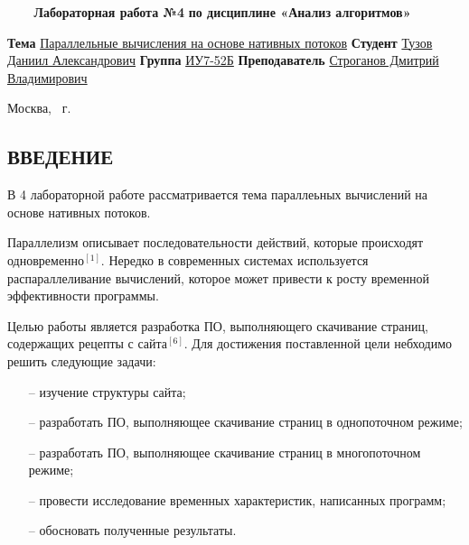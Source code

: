 \documentclass{article}
\begin{document}
\begin{titlepage}
	\noindent\begin{minipage}{1.0\textwidth}\centering
		\Large\textbf{   ~~~ Лабораторная работа №4}\newline
		\textbf{по дисциплине «Анализ алгоритмов»}\newline\newline\newline\newline\newline
	\end{minipage}

	\noindent\textbf{Тема} \underline{Параллельные вычисления на основе нативных потоков}\newline\newline
	\textbf{Студент} \underline{Тузов Даниил Александрович}\newline\newline
	\textbf{Группа} \underline{ИУ7-52Б}\newline\newline
	\textbf{Преподаватель} \underline{Строганов Дмитрий Владимирович}
	
	\begin{center}
		\vfill
		Москва, \the\year ~г.
	\end{center}
	\restoregeometry
	\clearpage
\end{titlepage}

\renewcommand{\contentsname}{\begin{center}СОДЕРЖАНИЕ\end{center}} 
\tableofcontents
\setcounter{page}{2}
\clearpage

\begin{center}\section*{ВВЕДЕНИЕ}\end{center}

В 4 лабораторной работе рассматривается тема параллеьных вычислений на основе нативных потоков.

Параллелизм описывает последовательности действий, которые происходят одновременно$^{[1]}$. Нередко в современных 
системах используется распараллеливание вычислений, которое может привести к росту временной эффективности программы.

Целью работы является разработка ПО, выполняющего скачивание страниц, содержащих рецепты с сайта$^{[6]}$.
Для достижения поставленной цели небходимо решить следующие задачи:
\begin{itemize}
	\item[--] изучение структуры сайта;
	\item[--] разработать ПО, выполняющее скачивание страниц в однопоточном режиме;
	\item[--] разработать ПО, выполняющее скачивание страниц в многопоточном режиме;
	\item[--] провести исследование временных характеристик, написанных программ;
	\item[--] обосновать полученные результаты.
\end{itemize}
\end{document}
